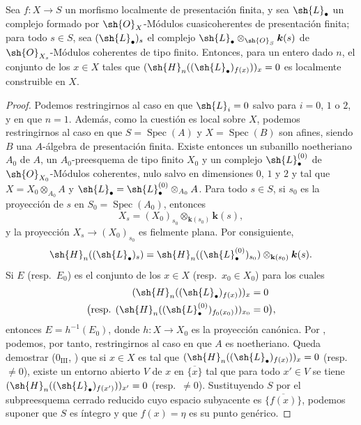 \begin{proposition}[9.9.6]
\label{IV.9.9.6}
Sea $f:X\to S$ un morfismo localmente de presentación finita, y sea $\sh{L}_\bullet$ un complejo formado por $\sh{O}_X$-Módulos cuasicoherentes de presentación finita; para todo $s\in S$, sea $(\sh{L}_\bullet)_s$ el complejo $\sh{L}_\bullet\otimes_{\sh{O}_S}\boldsymbol{k}(s)$ de $\sh{O}_{X_s}$-Módulos coherentes de tipo finito.
Entonces, para un entero dado $n$, el conjunto de los $x\in X$ tales que $(\sh{H}_n((\sh{L}_\bullet)_{f(x)}))_x=0$ es localmente construible en $X$.
\end{proposition}

\begin{proof}
\label{IV.9.9.6-proof}
Podemos restringirnos al caso en que $\sh{L}_i=0$ salvo para $i=0$, $1$ o $2$, y en que $n=1$.
Además, como la cuestión es local sobre $X$, podemos restringirnos al caso en que $S=\operatorname{Spec}(A)$ y $X=\operatorname{Spec}(B)$ son afines, siendo $B$ una $A$-álgebra de presentación finita.
Existe entonces un subanillo noetheriano $A_0$ de $A$, un $A_0$-preesquema de tipo finito $X_0$ y un complejo $\sh{L}_\bullet^{(0)}$ de $\sh{O}_{X_0}$-Módulos coherentes, nulo salvo en dimensiones $0$, $1$ y $2$ y tal que $X=X_0\otimes_{A_0}A$ y $\sh{L}_\bullet=\sh{L}_\bullet^{(0)}\otimes_{A_0}A$.
Para todo $s\in S$, si $s_0$ es la proyección de $s$ en $S_0=\operatorname{Spec}(A_0)$, entonces
\[
  X_s=(X_0)_{s_0}\otimes_{\mathbf{k}(s_0)}\boldsymbol{k}(s),
\]
y la proyección $X_s\to(X_0)_{s_0}$ es fielmente plana.
Por consiguiente,
\[
  \sh{H}_n((\sh{L}_\bullet)_s)
  =\sh{H}_n((\sh{L}_\bullet^{(0)})_{s_0})\otimes_{\mathbf{k}(s_0)}\boldsymbol{k}(s).
\]
Si $E$ (resp.~$E_0$) es el conjunto de los $x\in X$ (resp.~$x_0\in X_0$) para los cuales
\[
  \begin{aligned}
  (\sh{H}_n((\sh{L}_\bullet)_{f(x)}))_x&=0\\
  \bigl(\text{resp. }(\sh{H}_n((\sh{L}_\bullet^{(0)})_{f_0(x_0)}))_{x_0}&=0\bigr),
  \end{aligned}
\]
entonces $E=h^{-1}(E_0)$, donde $h:X\to X_0$ es la proyección canónica.
Por , podemos, por tanto, restringirnos al caso en que $A$ es noetheriano.
Queda demostrar ($0_{\mathrm{III}}$, ) que si $x\in X$ es tal que $(\sh{H}_n((\sh{L}_\bullet)_{f(x)}))_x=0$ (resp.~$\neq 0$), existe un entorno abierto $V$ de $x$ en $\overline{\{x\}}$ tal que para todo $x'\in V$ se tiene $(\sh{H}_n((\sh{L}_\bullet)_{f(x')}))_{x'}=0$ (resp.~$\neq 0$).
Sustituyendo $S$ por el subpreesquema cerrado reducido cuyo espacio subyacente es $\overline{\{f(x)\}}$, podemos suponer que $S$ es íntegro y que $f(x)=\eta$ es su punto genérico.

\end{proof}
